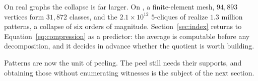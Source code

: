 On real graphs the collapse is far larger.
%
On \pkustk, a finite-element mesh, $94{,}893$ vertices form $31{,}872$ classes, and the $2.1\times10^{12}$ $5$-cliques of \webit{} realize $1.3$ million patterns, a collapse of six orders of magnitude.
%
Section~\ref{sec:index} returns to Equation~\eqref{eq:compression} as a predictor: the average is computable before any decomposition, and it decides in advance whether the quotient is worth building.

Patterns are now the unit of peeling.
%
The peel still needs their supports, and obtaining those without enumerating witnesses is the subject of the next section.
